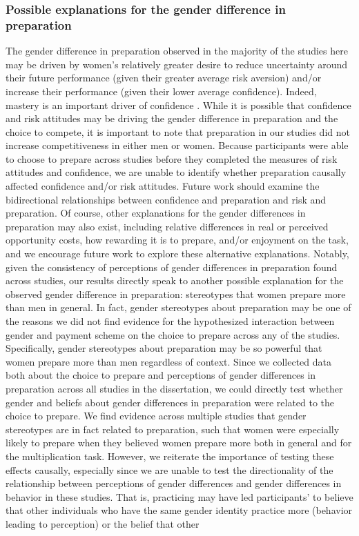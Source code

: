 \documentclass[letterpaper, nobind]{templates/ociamthesis}
\begin{document}
\hypertarget{possible-explanations-for-the-gender-difference-in-preparation}{%
\subsubsection{Possible explanations for the gender difference in preparation}\label{possible-explanations-for-the-gender-difference-in-preparation}}

The gender difference in preparation observed in the majority of the studies here may be driven by women's relatively greater desire to reduce uncertainty around their future performance (given their greater average risk aversion) and/or increase their performance (given their lower average confidence). Indeed, mastery is an important driver of confidence \autocites[for review, see][]{Gist1992,Usher2008}. While it is possible that confidence and risk attitudes may be driving the gender difference in preparation and the choice to compete, it is important to note that preparation in our studies did not increase competitiveness in either men or women. Because participants were able to choose to prepare across studies before they completed the measures of risk attitudes and confidence, we are unable to identify whether preparation causally affected confidence and/or risk attitudes. Future work should examine the bidirectional relationships between confidence and preparation and risk and preparation. Of course, other explanations for the gender differences in preparation may also exist, including relative differences in real or perceived opportunity costs, how rewarding it is to prepare, and/or enjoyment on the task, and we encourage future work to explore these alternative explanations. Notably, given the consistency of perceptions of gender differences in preparation found across studies, our results directly speak to another possible explanation for the observed gender difference in preparation: stereotypes that women prepare more than men in general. In fact, gender stereotypes about preparation may be one of the reasons we did not find evidence for the hypothesized interaction between gender and payment scheme on the choice to prepare across any of the studies. Specifically, gender stereotypes about preparation may be so powerful that women prepare more than men regardless of context. Since we collected data both about the choice to prepare and perceptions of gender differences in preparation across all studies in the dissertation, we could directly test whether gender and beliefs about gender differences in preparation were related to the choice to prepare. We find evidence across multiple studies that gender stereotypes are in fact related to preparation, such that women were especially likely to prepare when they believed women prepare more both in general and for the multiplication task. However, we reiterate the importance of testing these effects causally, especially since we are unable to test the directionality of the relationship between perceptions of gender differences and gender differences in behavior in these studies. That is, practicing may have led participants' to believe that other individuals who have the same gender identity practice more (behavior leading to perception) or the belief that other 
\end{document}
